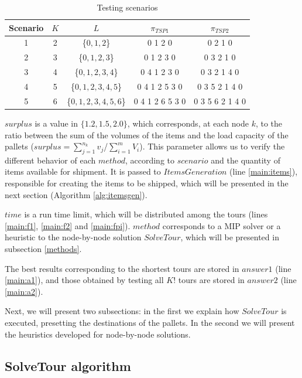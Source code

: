 \documentclass[preprint]{elsarticle}
\begin{document}
\vspace{2.0mm}
\begin{table}[H]
	\centering
	\caption{Testing scenarios}  \label{tab:scenarios}
	\begin{tabular}{c c c c c}
		\toprule
		{\bf Scenario} & $K$ & $L$ & $\pi_{TSP1}$ & $\pi_{TSP2}$ \\		
		\midrule
		1 & 2    & \{$0,1,2$\}           & 0 1 2 0  & 0 2 1 0 \\
		2 & 3    & \{$0,1,2,3$\}         & 0 1 2 3 0 & 0 3 2 1 0\\
		3 & 4    & \{$0,1,2,3,4$\}       & 0 4 1 2 3 0 & 0 3 2 1 4 0 \\
		4 & 5    & \{$0,1,2,3,4,5$\}     & 0 4 1 2 5 3 0 & 0 3 5 2 1 4 0 \\
		5 & 6    & \{$0,1,2,3,4,5,6$\}   & 0 4 1 2 6 5 3 0 & 0 3 5 6 2 1 4 0 \\
		\bottomrule
	\end{tabular}
\end{table}

$surplus$\/ is a value in $\{1.2, 1.5, 2.0\}$, which corresponds, at each node $k$, to the ratio between the sum of the volumes of the items  and the load capacity of the pallets ($surplus = \sum_{j=1}^{n_k} v_j$/$\sum_{i=1}^{m} V_i$). This parameter allows us to verify the different behavior of each $method$, according to $scenario$\/ and the quantity of items available for shipment. It is passed to $ItemsGeneration$\/ (line \ref{main:items}), responsible for creating the items to be shipped, which will be presented in the next section (Algorithm \ref{alg:itemsgen}).

$time$\/ is a run time limit, which will be distributed among the tours (lines \ref{main:f1}, \ref{main:f2} and \ref{main:fpi}). $method$\/ corresponds to a MIP solver or a heuristic to the node-by-node solution $SolveTour$, which will be presented in subsection \ref{methods}.

The best results corresponding to the shortest tours are stored in $answer1$\/ (line \ref{main:a1}), and those obtained by testing all $K!$\/ tours are stored in $answer2$\/ (line \ref{main:a2}).

Next, we will present two subsections: in the first we explain how $SolveTour$\/ is executed, presetting the destinations of the pallets. In the second we will present the heuristics developed for node-by-node solutions.


\subsection{SolveTour algorithm}
\label{tour}
\end{document}
